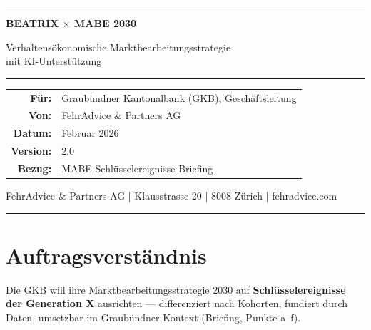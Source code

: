 \documentclass[11pt,a4paper]{article}
\begin{document}
\thispagestyle{empty}
\begin{center}
\vspace*{3cm}

{\color{fadarkblue}\rule{\textwidth}{2pt}}

\vspace{1.5cm}

{\Huge\bfseries\color{fadarkblue} BEATRIX $\times$ MABE 2030}

\vspace{0.8cm}

{\Large\color{fadarkgray} Verhaltensökonomische Marktbearbeitungsstrategie\\[0.3cm] mit KI-Unterstützung}

\vspace{2cm}

{\color{fadarkblue}\rule{0.4\textwidth}{0.5pt}}

\vspace{1.5cm}

\begin{tabular}{rl}
\textbf{\color{fadarkblue}Für:} & Graubündner Kantonalbank (GKB), Geschäftsleitung \\[0.3cm]
\textbf{\color{fadarkblue}Von:} & FehrAdvice \& Partners AG \\[0.3cm]
\textbf{\color{fadarkblue}Datum:} & Februar 2026 \\[0.3cm]
\textbf{\color{fadarkblue}Version:} & 2.0 \\[0.3cm]
\textbf{\color{fadarkblue}Bezug:} & MABE Schlüsselereignisse Briefing
\end{tabular}

\vfill

{\small\color{fadarkgray} FehrAdvice \& Partners AG | Klausstrasse 20 | 8008 Zürich | fehradvice.com}

\vspace{0.5cm}
{\color{fadarkblue}\rule{\textwidth}{2pt}}

\end{center}
\newpage


\section{Auftragsverständnis}

Die GKB will ihre Marktbearbeitungsstrategie 2030 auf \textbf{Schlüsselereignisse der Generation X} ausrichten --- differenziert nach Kohorten, fundiert durch Daten, umsetzbar im Graubündner Kontext (Briefing, Punkte a--f).
\end{document}
